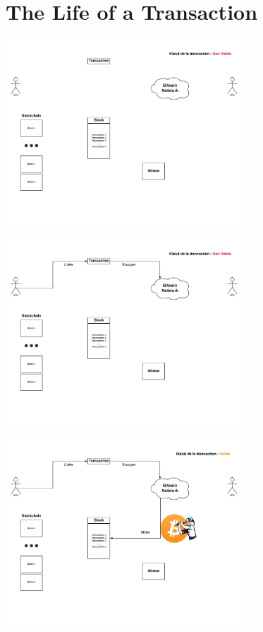 \documentclass{beamer}
\begin{document}
\section{The Life of a Transaction}

\begin{frame}
    \begin{center}
        \includegraphics[height=7cm]{images/explanation-0.png}
    \end{center}
\end{frame}

\begin{frame}
    \begin{center}
        \includegraphics[height=7cm]{images/explanation-2.png}
    \end{center}
\end{frame}

\begin{frame}
    \begin{center}
        \includegraphics[height=7cm]{images/explanation-3.png}
    \end{center}
\end{frame}
\end{document}
